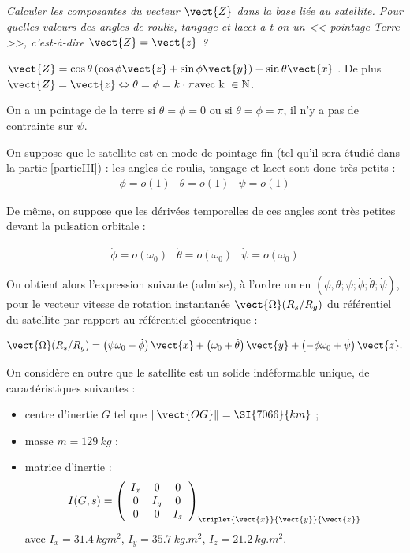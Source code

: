 \fi

\subparagraph{\label{q_6}}\textit{Calculer les composantes du vecteur $\vect{Z}$ dans la base  liée au satellite. Pour quelles valeurs des angles de roulis, tangage et lacet a-t-on un << pointage Terre >>, c'est-à-dire $\vect{Z}=\vect{z}$ ?}
\ifprof
\begin{corrige}
$\vect{Z}=\cos\theta\left(\cos\phi\vect{z}+\sin\phi\vect{y}\right)-\sin\theta\vect{x}$ .
De plus $\vect{Z}=\vect{z}\Leftrightarrow \theta=\phi=k\cdot \pi \text{avec k } \in \mathbb{N}$.

On a un pointage de la terre si $\theta=\phi=0$ ou si $\theta=\phi=\pi$, il n'y a pas de contrainte sur $\psi$.
\end{corrige}
\else
\fi

\ifprof
\else
On suppose que le satellite est en mode de pointage fin (tel qu'il sera
étudié dans la partie \ref{partieIII}) : les angles de roulis, tangage et
lacet sont donc très petits :
$$
\begin{array}{ccc}
\phi=o(1) &  \theta=o(1) & \psi=o(1)
\end{array}
$$

De même, on suppose que les dérivées temporelles de ces angles sont très
petites devant la pulsation orbitale :

$$
\begin{array}{ccc}
\dot{\phi}=o(\omega_0) & \dot{\theta}=o(\omega_0) & \dot{\psi}=o(\omega_0)
\end{array}
$$

On obtient alors l'expression suivante (admise), à l'ordre un en $\left(\phi,\theta;\psi;\dot{\phi};\dot{\theta};\dot{\psi}\right)$, pour
le vecteur vitesse de rotation instantanée $\vect{\Omega}(R_s/R_g)$ du référentiel du satellite
par rapport au référentiel géocentrique :

$$
\vect{\Omega}(R_s/R_g)=\left(\psi\omega_0+\dot{\phi}\right)\vect{x}+\left(\omega_0+\dot{\theta}\right)\vect{y}+\left(-\phi\omega_0+\dot{\psi}\right)\vect{z}.
$$

On considère en outre que le satellite est un solide indéformable
unique, de caractéristiques suivantes :

\begin{itemize}
\item  centre d'inertie $G$ tel que $\Vert \vect{OG} \Vert= \SI{7066}{km}$ ;
\item masse $m = \SI{129}{kg}$ ;
\item matrice d'inertie :
$$
I(G,s)=
\left(
\begin{array}{ccc}
I_x & 0 & 0 \\ 
0 & I_y & 0 \\ 
0 & 0 & I_z
\end{array}
\right)_{\triplet{\vect{x}}{\vect{y}}{\vect{z}}} 
$$
 avec $I_{x}= \SI{31,4}{kg m^2}$, $I_{y} = \SI{35,7}{kg.m^2}$, $I_{z} = \SI{21,2}{kg.m^2}$.
\end{itemize}

